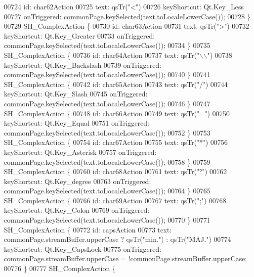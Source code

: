\begin{DoxyCode}
{00724         \textcolor{keywordtype}{id}: char62Action
00725         text: qsTr(\textcolor{stringliteral}{"<"})
00726         keyShortcut: Qt.Key\_Less
00727         onTriggered: commonPage.keySelected(text.toLocaleLowerCase());
00728     \}
00729     SH\_ComplexAction \{
00730         \textcolor{keywordtype}{id}: char63Action
00731         text: qsTr(\textcolor{stringliteral}{">"})
00732         keyShortcut: Qt.Key\_Greater
00733         onTriggered: commonPage.keySelected(text.toLocaleLowerCase());
00734     \}
00735     SH\_ComplexAction \{
00736         \textcolor{keywordtype}{id}: char64Action
00737         text: qsTr(\textcolor{stringliteral}{"\(\backslash\)\(\backslash\)"})
00738         keyShortcut: Qt.Key\_Backslash
00739         onTriggered: commonPage.keySelected(text.toLocaleLowerCase());
00740     \}
00741     SH\_ComplexAction \{
00742         \textcolor{keywordtype}{id}: char65Action
00743         text: qsTr(\textcolor{stringliteral}{"/"})
00744         keyShortcut: Qt.Key\_Slash
00745         onTriggered: commonPage.keySelected(text.toLocaleLowerCase());
00746     \}
00747     SH\_ComplexAction \{
00748         \textcolor{keywordtype}{id}: char66Action
00749         text: qsTr(\textcolor{stringliteral}{"="})
00750         keyShortcut: Qt.Key\_Equal
00751         onTriggered: commonPage.keySelected(text.toLocaleLowerCase());
00752     \}
00753     SH\_ComplexAction \{
00754         \textcolor{keywordtype}{id}: char67Action
00755         text: qsTr(\textcolor{stringliteral}{"*"})
00756         keyShortcut: Qt.Key\_Asterisk
00757         onTriggered: commonPage.keySelected(text.toLocaleLowerCase());
00758     \}
00759     SH\_ComplexAction \{
00760         \textcolor{keywordtype}{id}: char68Action
00761         text: qsTr(\textcolor{stringliteral}{"°"})
00762         keyShortcut: Qt.Key\_degree
00763         onTriggered: commonPage.keySelected(text.toLocaleLowerCase());
00764     \}
00765     SH\_ComplexAction \{
00766         \textcolor{keywordtype}{id}: char69Action
00767         text: qsTr(\textcolor{stringliteral}{";"})
00768         keyShortcut: Qt.Key\_Colon
00769         onTriggered: commonPage.keySelected(text.toLocaleLowerCase());
00770     \}
00771     SH\_ComplexAction \{
00772         \textcolor{keywordtype}{id}: capsAction
00773         text: commonPage.streamBuffer.upperCase ? qsTr(\textcolor{stringliteral}{"min."}) : qsTr(\textcolor{stringliteral}{"MAJ."})
00774         keyShortcut: Qt.Key\_CapsLock
00775         onTriggered: commonPage.streamBuffer.upperCase = !commonPage.streamBuffer.upperCase;
00776     \}
00777     SH\_ComplexAction \{
}
\end{DoxyCode}
